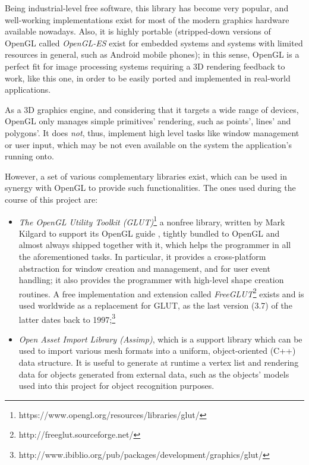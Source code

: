 Being industrial-level free software, this library has become very popular, and
well-working implementations exist for most of the modern graphics hardware
available nowadays. Also, it is highly portable (stripped-down versions of OpenGL
called \emph{OpenGL-ES} exist for embedded systems and systems with limited
resources in general, such as Android mobile phones); in this sense, OpenGL is
a perfect fit for image processing systems requiring a 3D rendering feedback to
work, like this one, in order to be easily ported and implemented in real-world
applications.

As a 3D graphics engine, and considering that it targets a wide range of devices, OpenGL only manages simple primitives' rendering, such
as points', lines' and polygons'. It does \emph{not}, thus, implement
high level tasks like window management or user input, which may be not even
available on the system the application's running onto.

However, a set of various complementary libraries exist, which can be used in
synergy with OpenGL to provide such functionalities. The ones used during the
course of this project are:

\begin{itemize}
  \item{\emph{The OpenGL Utility Toolkit
      (\emph{GLUT})}\footnote{https://www.opengl.org/resources/libraries/glut/} a
      nonfree library, written by Mark Kilgard to support its OpenGL guide
      \cite{opengl-book}, tightly bundled to OpenGL and
      almost always shipped together with it, which helps the programmer in all the
      aforementioned tasks. In particular, it provides a cross-platform abstraction
      for window creation and management, and for user event handling; it also
      provides the programmer with high-level shape creation routines. A free
      implementation and extension called
      \emph{FreeGLUT}\footnote{http://freeglut.sourceforge.net/} exists and is used
      worldwide as a replacement for GLUT, as the last version (3.7) of the latter dates
      back to
    1997;\footnote{http://www.ibiblio.org/pub/packages/development/graphics/glut/}}

  \item{
      \emph{Open Asset Import Library (\emph{Assimp})}, which is a support library which
      can be used to import various mesh formats into a uniform, object-oriented (C++)
      data structure. It is useful to generate at runtime a vertex list and rendering
      data for objects
      generated from external data, such as the objects' models used into this project
      for object recognition purposes.
    }
\end{itemize}

